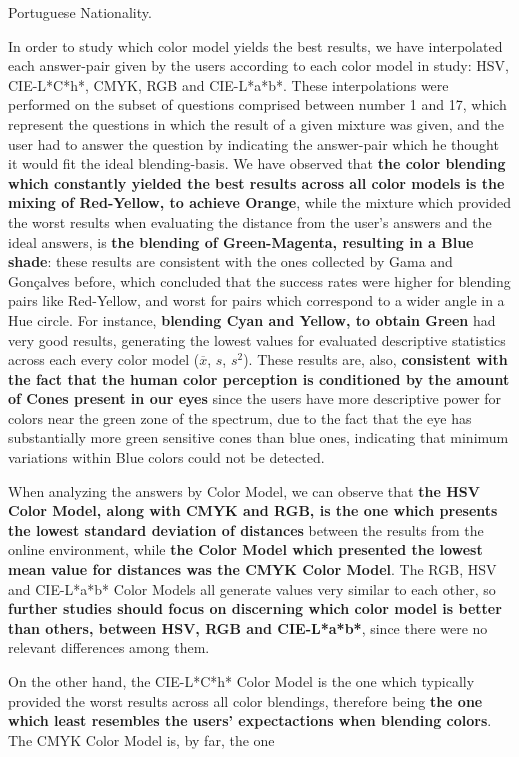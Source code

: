 Portuguese Nationality. \par
%
In order to study which color model yields the best results, we have interpolated each answer-pair given by the users according to each color model in study: HSV, CIE-L*C*h*, CMYK, RGB and CIE-L*a*b*. These interpolations were performed on the subset of questions comprised between
number 1 and 17, which represent the questions in which the result of a given mixture was given, and the user had to answer the question by indicating the answer-pair which he thought it would fit the ideal blending-basis.
We have observed that \textbf{the color blending which constantly yielded the best results across all color models is the mixing of Red-Yellow, to achieve Orange}, while the mixture which provided the worst results when evaluating the distance from the user's
answers and the ideal answers, is \textbf{the blending of Green-Magenta, resulting in a Blue shade}: these results are consistent with the ones collected by Gama and Gonçalves \cite{Gama20141} before, which concluded that the success rates were higher for blending pairs
like Red-Yellow, and worst for pairs which correspond to a wider angle in a Hue circle. For instance, \textbf{blending Cyan and Yellow, to obtain Green} had very good results, generating the lowest values for evaluated descriptive statistics across each
every color model ($\overline{x}$, $s$, $s^2$). These results are, also, \textbf{consistent with the fact that the human color perception is conditioned by the amount of Cones present in our eyes} since the users have more descriptive power for colors near the
green zone of the spectrum, due to the fact that the eye has substantially more green sensitive cones than blue ones, indicating that minimum variations within Blue colors could not be detected. \par
%
When analyzing the answers by Color Model, we can observe that \textbf{the HSV Color Model, along with CMYK and RGB, is the one which presents the lowest standard deviation of distances} between the results from the online environment, while \textbf{the Color Model
which presented the lowest mean value for distances was the CMYK Color Model}. The RGB, HSV and CIE-L*a*b* Color Models all generate values very similar to each other, so \textbf{further studies should focus on discerning which color model is better than others, between
HSV, RGB and CIE-L*a*b*}, since there were no relevant differences among them. \par
%
On the other hand, the CIE-L*C*h* Color Model is the one which typically provided the worst results across all color blendings, therefore being \textbf{the one which least resembles the users' expectactions when blending colors}. The CMYK Color Model is, by far, the one
